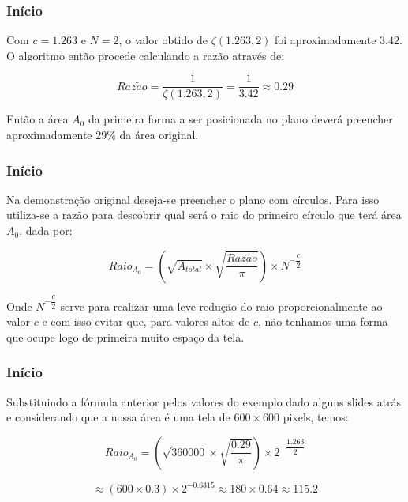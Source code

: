 \documentclass[aspectratio=169]{beamer}
\begin{document}
\begin{frame}
\frametitle{Início}

Com $c=1.263$ e $N=2$, o valor obtido de $\zeta(1.263,2)$ foi aproximadamente $3.42$. O algoritmo então procede calculando a razão através de: 
\medskip

\begin{equation}
Raz\tilde{a}o=\dfrac{1}{\zeta(1.263,2)}=\dfrac{1}{3.42}\approx0.29
\end{equation}
\medskip

Então a área $A_{0}$ da primeira forma a ser posicionada no plano deverá preencher aproximadamente $29\%$ da área original.
\medskip

\end{frame}

\begin{frame}
\frametitle{Início}

Na demonstração original deseja-se preencher o plano com círculos. Para isso utiliza-se a razão para descobrir qual será o raio do primeiro círculo que terá área $A_{0}$, dada por:
\medskip

\begin{equation}
Raio_{A_{0}}= (\sqrt{A_{total}} \times \sqrt{\dfrac{Raz\tilde{a}o}{\pi}}) \times N^{-\dfrac{c}{2}} 
\end{equation}
\medskip

Onde $N^{-\dfrac{c}{2}}$ serve para realizar uma leve redução do raio proporcionalmente ao valor $c$ e com isso evitar que, para valores altos de $c$, não tenhamos uma forma que ocupe logo de primeira muito espaço da tela.
\medskip

\end{frame}

\begin{frame}
\frametitle{Início}

Substituindo a fórmula anterior pelos valores do exemplo dado alguns slides atrás e considerando que a nossa área é uma tela de $600\times600$ pixels, temos:
\medskip

\begin{equation}
Raio_{A_{0}} = (\sqrt{360000} \times \sqrt{\dfrac{0.29}{\pi}}) \times 2^{-\dfrac{1.263}{2}}
\end{equation}

$$
\approx (600 \times 0.3) \times 2^{-0.6315} \approx 180 \times 0.64 \approx 115.2
$$

\end{frame}
\end{document}
